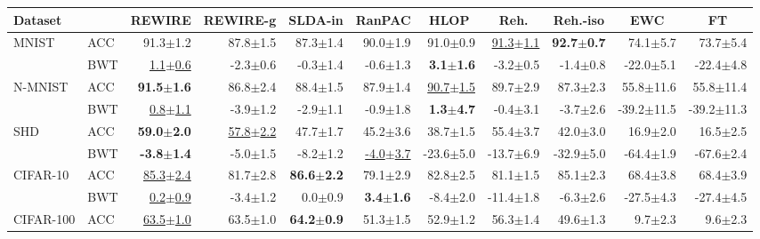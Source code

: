 \begin{tabular}{llrrrrrrrrr}
\toprule
Dataset & & \multicolumn{1}{c}{REWIRE} & \multicolumn{1}{c}{REWIRE-g} & \multicolumn{1}{c}{SLDA-in} & \multicolumn{1}{c}{RanPAC} & \multicolumn{1}{c}{HLOP} & \multicolumn{1}{c}{Reh.} & \multicolumn{1}{c}{Reh.-iso} & \multicolumn{1}{c}{EWC} & \multicolumn{1}{c}{FT} \\
\midrule
MNIST & ACC & 91.3{\tiny$\pm$1.2} & 87.8{\tiny$\pm$1.5} & 87.3{\tiny$\pm$1.4} & 90.0{\tiny$\pm$1.9} & 91.0{\tiny$\pm$0.9} & \underline{91.3{\tiny$\pm$1.1}} & \textbf{92.7{\tiny$\pm$0.7}} & 74.1{\tiny$\pm$5.7} & 73.7{\tiny$\pm$5.4} \\
 & BWT & \underline{1.1{\tiny$\pm$0.6}} & -2.3{\tiny$\pm$0.6} & -0.3{\tiny$\pm$1.4} & -0.6{\tiny$\pm$1.3} & \textbf{3.1{\tiny$\pm$1.6}} & -3.2{\tiny$\pm$0.5} & -1.4{\tiny$\pm$0.8} & -22.0{\tiny$\pm$5.1} & -22.4{\tiny$\pm$4.8} \\
N-MNIST & ACC & \textbf{91.5{\tiny$\pm$1.6}} & 86.8{\tiny$\pm$2.4} & 88.4{\tiny$\pm$1.5} & 87.9{\tiny$\pm$1.4} & \underline{90.7{\tiny$\pm$1.5}} & 89.7{\tiny$\pm$2.9} & 87.3{\tiny$\pm$2.3} & 55.8{\tiny$\pm$11.6} & 55.8{\tiny$\pm$11.4} \\
 & BWT & \underline{0.8{\tiny$\pm$1.1}} & -3.9{\tiny$\pm$1.2} & -2.9{\tiny$\pm$1.1} & -0.9{\tiny$\pm$1.8} & \textbf{1.3{\tiny$\pm$4.7}} & -0.4{\tiny$\pm$3.1} & -3.7{\tiny$\pm$2.6} & -39.2{\tiny$\pm$11.5} & -39.2{\tiny$\pm$11.3} \\
SHD & ACC & \textbf{59.0{\tiny$\pm$2.0}} & \underline{57.8{\tiny$\pm$2.2}} & 47.7{\tiny$\pm$1.7} & 45.2{\tiny$\pm$3.6} & 38.7{\tiny$\pm$1.5} & 55.4{\tiny$\pm$3.7} & 42.0{\tiny$\pm$3.0} & 16.9{\tiny$\pm$2.0} & 16.5{\tiny$\pm$2.5} \\
 & BWT & \textbf{-3.8{\tiny$\pm$1.4}} & -5.0{\tiny$\pm$1.5} & -8.2{\tiny$\pm$1.2} & \underline{-4.0{\tiny$\pm$3.7}} & -23.6{\tiny$\pm$5.0} & -13.7{\tiny$\pm$6.9} & -32.9{\tiny$\pm$5.0} & -64.4{\tiny$\pm$1.9} & -67.6{\tiny$\pm$2.4} \\
\midrule
CIFAR-10 & ACC & \underline{85.3{\tiny$\pm$2.4}} & 81.7{\tiny$\pm$2.8} & \textbf{86.6{\tiny$\pm$2.2}} & 79.1{\tiny$\pm$2.9} & 82.8{\tiny$\pm$2.5} & 81.1{\tiny$\pm$1.5} & 85.1{\tiny$\pm$2.3} & 68.4{\tiny$\pm$3.8} & 68.4{\tiny$\pm$3.9} \\
 & BWT & \underline{0.2{\tiny$\pm$0.9}} & -3.4{\tiny$\pm$1.2} & 0.0{\tiny$\pm$0.9} & \textbf{3.4{\tiny$\pm$1.6}} & -8.4{\tiny$\pm$2.0} & -11.4{\tiny$\pm$1.8} & -6.3{\tiny$\pm$2.6} & -27.5{\tiny$\pm$4.3} & -27.4{\tiny$\pm$4.5} \\
CIFAR-100 & ACC & \underline{63.5{\tiny$\pm$1.0}} & 63.5{\tiny$\pm$1.0} & \textbf{64.2{\tiny$\pm$0.9}} & 51.3{\tiny$\pm$1.5} & 52.9{\tiny$\pm$1.2} & 56.3{\tiny$\pm$1.4} & 49.6{\tiny$\pm$1.3} & 9.7{\tiny$\pm$2.3} & 9.6{\tiny$\pm$2.3} \\

\end{tabular}
